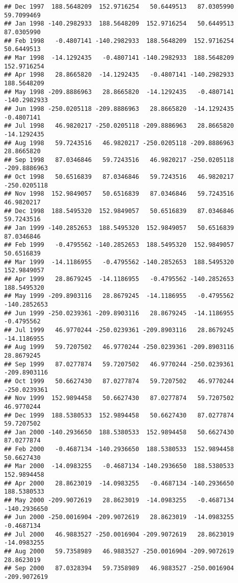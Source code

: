 \documentclass[]{article}
\begin{document}
\begin{verbatim}
## Dec 1997  188.5648209  152.9716254   50.6449513   87.0305990   59.7099469
## Jan 1998 -140.2982933  188.5648209  152.9716254   50.6449513   87.0305990
## Feb 1998   -0.4807141 -140.2982933  188.5648209  152.9716254   50.6449513
## Mar 1998  -14.1292435   -0.4807141 -140.2982933  188.5648209  152.9716254
## Apr 1998   28.8665820  -14.1292435   -0.4807141 -140.2982933  188.5648209
## May 1998 -209.8886963   28.8665820  -14.1292435   -0.4807141 -140.2982933
## Jun 1998 -250.0205118 -209.8886963   28.8665820  -14.1292435   -0.4807141
## Jul 1998   46.9820217 -250.0205118 -209.8886963   28.8665820  -14.1292435
## Aug 1998   59.7243516   46.9820217 -250.0205118 -209.8886963   28.8665820
## Sep 1998   87.0346846   59.7243516   46.9820217 -250.0205118 -209.8886963
## Oct 1998   50.6516839   87.0346846   59.7243516   46.9820217 -250.0205118
## Nov 1998  152.9849057   50.6516839   87.0346846   59.7243516   46.9820217
## Dec 1998  188.5495320  152.9849057   50.6516839   87.0346846   59.7243516
## Jan 1999 -140.2852653  188.5495320  152.9849057   50.6516839   87.0346846
## Feb 1999   -0.4795562 -140.2852653  188.5495320  152.9849057   50.6516839
## Mar 1999  -14.1186955   -0.4795562 -140.2852653  188.5495320  152.9849057
## Apr 1999   28.8679245  -14.1186955   -0.4795562 -140.2852653  188.5495320
## May 1999 -209.8903116   28.8679245  -14.1186955   -0.4795562 -140.2852653
## Jun 1999 -250.0239361 -209.8903116   28.8679245  -14.1186955   -0.4795562
## Jul 1999   46.9770244 -250.0239361 -209.8903116   28.8679245  -14.1186955
## Aug 1999   59.7207502   46.9770244 -250.0239361 -209.8903116   28.8679245
## Sep 1999   87.0277874   59.7207502   46.9770244 -250.0239361 -209.8903116
## Oct 1999   50.6627430   87.0277874   59.7207502   46.9770244 -250.0239361
## Nov 1999  152.9894458   50.6627430   87.0277874   59.7207502   46.9770244
## Dec 1999  188.5380533  152.9894458   50.6627430   87.0277874   59.7207502
## Jan 2000 -140.2936650  188.5380533  152.9894458   50.6627430   87.0277874
## Feb 2000   -0.4687134 -140.2936650  188.5380533  152.9894458   50.6627430
## Mar 2000  -14.0983255   -0.4687134 -140.2936650  188.5380533  152.9894458
## Apr 2000   28.8623019  -14.0983255   -0.4687134 -140.2936650  188.5380533
## May 2000 -209.9072619   28.8623019  -14.0983255   -0.4687134 -140.2936650
## Jun 2000 -250.0016904 -209.9072619   28.8623019  -14.0983255   -0.4687134
## Jul 2000   46.9883527 -250.0016904 -209.9072619   28.8623019  -14.0983255
## Aug 2000   59.7358989   46.9883527 -250.0016904 -209.9072619   28.8623019
## Sep 2000   87.0328394   59.7358989   46.9883527 -250.0016904 -209.9072619

\end{verbatim}
\end{document}

